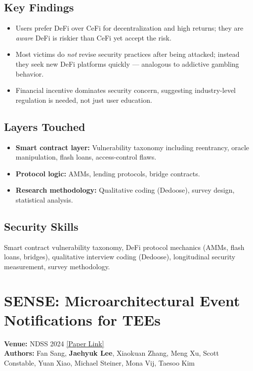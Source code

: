 \documentclass[11pt,letterpaper]{article}
\begin{document}
\subsection*{Key Findings}
\begin{itemize}
    \item Users prefer DeFi over CeFi for decentralization and high returns; they are \emph{aware} DeFi is riskier than CeFi yet accept the risk.
    \item Most victims do \emph{not} revise security practices after being attacked; instead they seek new DeFi platforms quickly — analogous to addictive gambling behavior.
    \item Financial incentive dominates security concern, suggesting industry-level regulation is needed, not just user education.
\end{itemize}

\subsection*{Layers Touched}
\begin{itemize}
    \item \textbf{Smart contract layer:} Vulnerability taxonomy including reentrancy, oracle manipulation, flash loans, access-control flaws.
    \item \textbf{Protocol logic:} AMMs, lending protocols, bridge contracts.
    \item \textbf{Research methodology:} Qualitative coding (Dedoose), survey design, statistical analysis.
\end{itemize}

\subsection*{Security Skills}
Smart contract vulnerability taxonomy, DeFi protocol mechanics (AMMs, flash loans, bridges), qualitative interview coding (Dedoose), longitudinal security measurement, survey methodology.

\newpage

\section{SENSE: Microarchitectural Event Notifications for TEEs}
\textbf{Venue:} NDSS 2024 \hfill
\href{https://www.ndss-symposium.org/wp-content/uploads/2024-176-paper.pdf}{[Paper Link]}\\
\textbf{Authors:} Fan Sang, \textbf{Jaehyuk Lee}, Xiaokuan Zhang, Meng Xu, Scott Constable, Yuan Xiao, Michael Steiner, Mona Vij, Taesoo Kim
\end{document}
